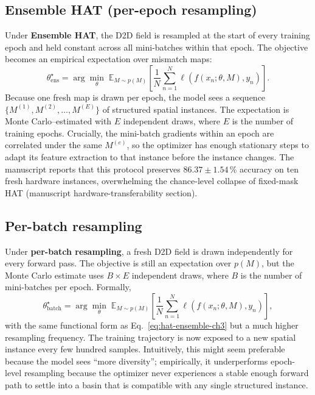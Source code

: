 \subsection{Ensemble HAT (per-epoch resampling)}

Under \textbf{Ensemble HAT}, the D2D field is resampled at the start of every training epoch and held constant across all mini-batches within that epoch. The objective becomes an empirical expectation over mismatch maps:
\begin{equation}
    \theta_{\mathrm{ens}}^{\star}=\arg\min_{\theta}\;\mathbb{E}_{M\sim p(M)}\!\left[\frac{1}{N}\sum_{n=1}^{N}\ell\!\left(f(x_{n};\theta,M),y_{n}\right)\right].
\label{eq:hat-ensemble-ch3}
\end{equation}
Because one fresh map is drawn per epoch, the model sees a sequence $\{M^{(1)},M^{(2)},\dots,M^{(E)}\}$ of structured spatial instances. The expectation is Monte Carlo--estimated with $E$ independent draws, where $E$ is the number of training epochs. Crucially, the mini-batch gradients within an epoch are correlated under the same $M^{(e)}$, so the optimizer has enough stationary steps to adapt its feature extraction to that instance before the instance changes. The manuscript reports that this protocol preserves $86.37\pm1.54\,\%$ accuracy on ten fresh hardware instances, overwhelming the chance-level collapse of fixed-mask HAT (manuscript hardware-transferability section).

\subsection{Per-batch resampling}

Under \textbf{per-batch resampling}, a fresh D2D field is drawn independently for every forward pass. The objective is still an expectation over $p(M)$, but the Monte Carlo estimate uses $B\times E$ independent draws, where $B$ is the number of mini-batches per epoch. Formally,
\begin{equation}
    \theta_{\mathrm{batch}}^{\star}=\arg\min_{\theta}\;\mathbb{E}_{M\sim p(M)}\!\left[\frac{1}{N}\sum_{n=1}^{N}\ell\!\left(f(x_{n};\theta,M),y_{n}\right)\right],
\label{eq:hat-batch}
\end{equation}
with the same functional form as Eq.~\ref{eq:hat-ensemble-ch3} but a much higher resampling frequency. The training trajectory is now exposed to a new spatial instance every few hundred samples. Intuitively, this might seem preferable because the model sees ``more diversity''; empirically, it underperforms epoch-level resampling because the optimizer never experiences a stable enough forward path to settle into a basin that is compatible with any single structured instance.

